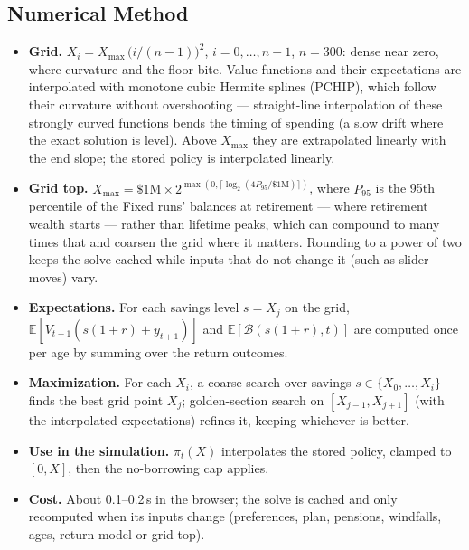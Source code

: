 \documentclass[11pt,letterpaper]{article}
\begin{document}
\subsection{Numerical Method}
\begin{itemize}
\setlength\itemsep{1pt}
\item \textbf{Grid.} $X_i = X_{\max}\,\big(i/(n-1)\big)^2$, $i = 0,\dots,n-1$, $n = 300$: dense near zero, where curvature and the floor bite. Value functions and their expectations are interpolated with monotone cubic Hermite splines (PCHIP), which follow their curvature without overshooting --- straight-line interpolation of these strongly curved functions bends the timing of spending (a slow drift where the exact solution is level). Above $X_{\max}$ they are extrapolated linearly with the end slope; the stored policy is interpolated linearly.
\item \textbf{Grid top.} $X_{\max} = \$1\text{M}\times 2^{\max(0,\lceil \log_2(4P_{95}/\$1\text{M})\rceil)}$, where $P_{95}$ is the 95th percentile of the Fixed runs' balances at retirement --- where retirement wealth starts --- rather than lifetime peaks, which can compound to many times that and coarsen the grid where it matters. Rounding to a power of two keeps the solve cached while inputs that do not change it (such as slider moves) vary.
\item \textbf{Expectations.} For each savings level $s = X_j$ on the grid, $\mathbb{E}[V_{t+1}(s(1+r)+y_{t+1})]$ and $\mathbb{E}[\mathcal{B}(s(1+r),t)]$ are computed once per age by summing over the return outcomes.
\item \textbf{Maximization.} For each $X_i$, a coarse search over savings $s \in \{X_0,\dots,X_i\}$ finds the best grid point $X_j$; golden-section search on $[X_{j-1}, X_{j+1}]$ (with the interpolated expectations) refines it, keeping whichever is better.
\item \textbf{Use in the simulation.} $\pi_t(X)$ interpolates the stored policy, clamped to $[0, X]$, then the no-borrowing cap applies.
\item \textbf{Cost.} About 0.1--0.2\,s in the browser; the solve is cached and only recomputed when its inputs change (preferences, plan, pensions, windfalls, ages, return model or grid top).
\end{itemize}
\end{document}
